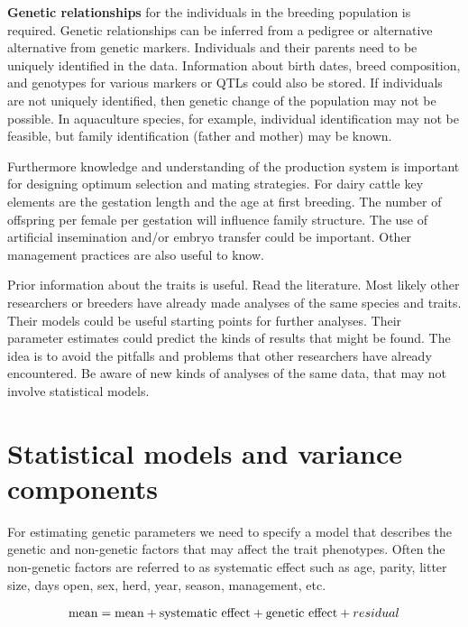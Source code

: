 \documentclass[
]{book}
\begin{document}
\textbf{Genetic relationships} for the individuals in the breeding population is required. Genetic relationships can be inferred from a pedigree or alternative alternative from genetic markers. Individuals and their parents need to be uniquely identified in the data. Information about birth dates, breed composition, and genotypes for various markers or QTLs could also be stored. If individuals are not uniquely identified, then genetic change of the population may not be
possible. In aquaculture species, for example, individual identification may not be feasible,
but family identification (father and mother) may be known.

Furthermore knowledge and understanding of the production system is
important for designing optimum selection and mating strategies. For dairy cattle key elements are the
gestation length and the age at first breeding. The number of offspring per female per
gestation will influence family structure. The use of artificial insemination and/or embryo
transfer could be important. Other management practices are also useful to know.

Prior information about the traits is useful. Read the literature. Most likely other researchers or
breeders have already made analyses of the same species and traits. Their models could be useful
starting points for further analyses. Their parameter estimates could predict the kinds of
results that might be found. The idea is to avoid the pitfalls and problems that other
researchers have already encountered. Be aware of new kinds of analyses of the same data,
that may not involve statistical models.

\hypertarget{statistical-models-and-variance-components}{%
\section{Statistical models and variance components}\label{statistical-models-and-variance-components}}

For estimating genetic parameters we need to specify a model that describes the genetic and non-genetic factors that may affect the trait phenotypes. Often the non-genetic factors are referred to as systematic effect
such as age, parity, litter size, days open, sex, herd, year, season, management, etc.

\begin{align}
            \text{mean}=\text{mean} + \text{systematic effect} + \text{genetic effect}  + residual   \notag
\end{align}
\end{document}
